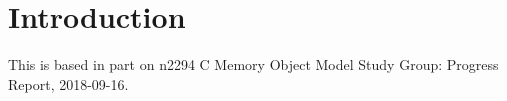 \documentclass[acmsmall,review,screen]{acmart}\settopmatter{printfolios=true,printccs=false,printacmref=false}
\begin{document}




\maketitle




\newcommand{\myt}[1]{{\color{blue}#1}}
\newcommand{\myu}[1]{{\color{myudicolor}#1}}

\section{Introduction}



This is based in part on n2294 C Memory Object Model Study Group:
Progress Report, 2018-09-16.  
\end{document}
